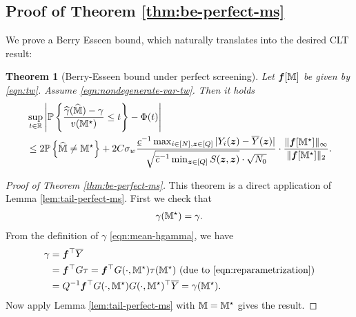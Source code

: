 \documentclass[12pt]{article}
\newtheorem{theorem}{Theorem}
\begin{document}
\subsection{Proof of Theorem \ref{thm:be-perfect-ms}}
We prove a Berry Esseen bound, which naturally translates into the desired CLT result:
\begin{theorem}[Berry-Esseen bound under perfect  screening]
Let ${{\boldsymbol{f}}}[{\mathbb{M}}]$ be given by \eqref{eqn:tw}. Assume \eqref{eqn:nondegenerate-var-tw}. 
Then it holds
\begin{align}\label{eqn:be-perfect-ms}
    &\sup_{t\in{\mathbb{R}}}\left|{{\mathbb{P}}\left\{\frac{{\widehat{\gamma}}(\widehat{{\mathbb{M}}})-\gamma}{v({\mathbb{M}}^\star)} \le t\right\}} - \Phi(t)\right| \notag\\
    &\le 2{{\mathbb{P}}\left\{\widehat{{\mathbb{M}}}\neq {\mathbb{M}}^\star\right\}} +  2C\sigma_w   \frac{\underline{c}^{-1} \max_{i\in[N],{\boldsymbol{z}}\in[Q]}|Y_i({\boldsymbol{z}})-\overline{Y}({\boldsymbol{z}})|}{\sqrt{\overline{c}^{-1} \min_{{\boldsymbol{z}}\in[Q]} S({\boldsymbol{z}},{\boldsymbol{z}})}\cdot \sqrt{N_0}}\cdot  \frac{\|{{\boldsymbol{f}}}[{\mathbb{M}}^\star]\|_\infty}{\|{{\boldsymbol{f}}}[{\mathbb{M}}^\star]\|_2} .
\end{align}
\end{theorem}
\begin{proof}[Proof of Theorem \ref{thm:be-perfect-ms}]
This theorem is a direct application of Lemma \ref{lem:tail-perfect-ms}.
First we check that 
\begin{align*}
    \gamma({\mathbb{M}}^\star) = \gamma.
\end{align*}
From the definition of $\gamma$ \eqref{eqn:mean-hgamma}, we have
\begin{align*}
    \gamma &= {\boldsymbol{f}}^\top \overline{Y}\\
    &= {\boldsymbol{f}}^\top G\tau ={\boldsymbol{f}}^\top G(\cdot, {\mathbb{M}}^\star)\tau({\mathbb{M}}^\star) \text{ (due to \eqref{eqn:reparametrization})} \\
    &=Q^{-1}{\boldsymbol{f}}^\top G(\cdot, {\mathbb{M}}^\star)G(\cdot,{\mathbb{M}}^\star)^\top \overline{Y} = \gamma({\mathbb{M}}^\star).
\end{align*}
Now apply Lemma \ref{lem:tail-perfect-ms} with ${\mathbb{M}} = {\mathbb{M}}^\star$ gives the result.  
\end{proof}
\end{document}
